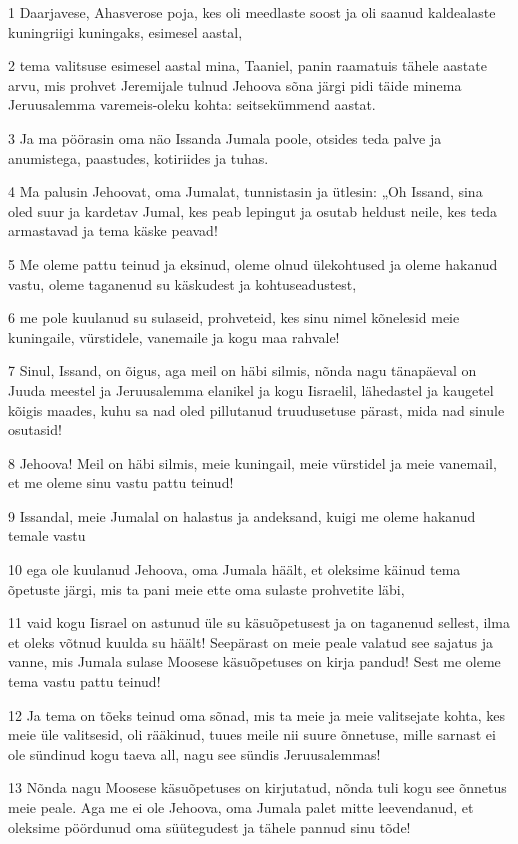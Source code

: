 \par 1 Daarjavese, Ahasverose poja, kes oli meedlaste soost ja oli saanud kaldealaste kuningriigi kuningaks, esimesel aastal,
\par 2 tema valitsuse esimesel aastal mina, Taaniel, panin raamatuis tähele aastate arvu, mis prohvet Jeremijale tulnud Jehoova sõna järgi pidi täide minema Jeruusalemma varemeis-oleku kohta: seitsekümmend aastat.
\par 3 Ja ma pöörasin oma näo Issanda Jumala poole, otsides teda palve ja anumistega, paastudes, kotiriides ja tuhas.
\par 4 Ma palusin Jehoovat, oma Jumalat, tunnistasin ja ütlesin: „Oh Issand, sina oled suur ja kardetav Jumal, kes peab lepingut ja osutab heldust neile, kes teda armastavad ja tema käske peavad!
\par 5 Me oleme pattu teinud ja eksinud, oleme olnud ülekohtused ja oleme hakanud vastu, oleme taganenud su käskudest ja kohtuseadustest,
\par 6 me pole kuulanud su sulaseid, prohveteid, kes sinu nimel kõnelesid meie kuningaile, vürstidele, vanemaile ja kogu maa rahvale!
\par 7 Sinul, Issand, on õigus, aga meil on häbi silmis, nõnda nagu tänapäeval on Juuda meestel ja Jeruusalemma elanikel ja kogu Iisraelil, lähedastel ja kaugetel kõigis maades, kuhu sa nad oled pillutanud truudusetuse pärast, mida nad sinule osutasid!
\par 8 Jehoova! Meil on häbi silmis, meie kuningail, meie vürstidel ja meie vanemail, et me oleme sinu vastu pattu teinud!
\par 9 Issandal, meie Jumalal on halastus ja andeksand, kuigi me oleme hakanud temale vastu
\par 10 ega ole kuulanud Jehoova, oma Jumala häält, et oleksime käinud tema õpetuste järgi, mis ta pani meie ette oma sulaste prohvetite läbi,
\par 11 vaid kogu Iisrael on astunud üle su käsuõpetusest ja on taganenud sellest, ilma et oleks võtnud kuulda su häält! Seepärast on meie peale valatud see sajatus ja vanne, mis Jumala sulase Moosese käsuõpetuses on kirja pandud! Sest me oleme tema vastu pattu teinud!
\par 12 Ja tema on tõeks teinud oma sõnad, mis ta meie ja meie valitsejate kohta, kes meie üle valitsesid, oli rääkinud, tuues meile nii suure õnnetuse, mille sarnast ei ole sündinud kogu taeva all, nagu see sündis Jeruusalemmas!
\par 13 Nõnda nagu Moosese käsuõpetuses on kirjutatud, nõnda tuli kogu see õnnetus meie peale. Aga me ei ole Jehoova, oma Jumala palet mitte leevendanud, et oleksime pöördunud oma süütegudest ja tähele pannud sinu tõde!
